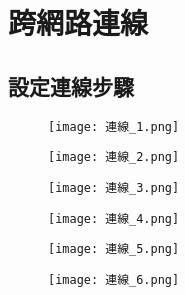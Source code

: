\chapter{跨網路連線}
\section{設定連線步驟}
\begin{figure}[hbt!]
  \begin{center}
    \texttt{[image: 連線\_1.png]}
  \end{center}
  \caption[關閉防火牆]{}
  \label{fig:photo}
\end{figure}

\begin{figure}[hbt!]
  \begin{center}
    \texttt{[image: 連線\_2.png]}
  \end{center}
  \caption[點選進階設定]{}
  \label{fig:photo}
\end{figure}

\begin{figure}[hbt!]
  \begin{center}
    \texttt{[image: 連線\_3.png]}
  \end{center}
  \caption[設定輸入及輸出規則類型]{}
  \label{fig:photo}
\end{figure}

\begin{figure}[hbt!]
  \begin{center}
    \texttt{[image: 連線\_4.png]}
  \end{center}
  \caption[設定特定遠端連接埠]{}
  \label{fig:photo}
\end{figure}

\begin{figure}[hbt!]
  \begin{center}
    \texttt{[image: 連線\_5.png]}
  \end{center}
  \caption[v允許連線]{}
  \label{fig:photo}
\end{figure}

\begin{figure}[hbt!]
  \begin{center}
    \texttt{[image: 連線\_6.png]}
  \end{center}
  \caption[設定名稱]{}
  \label{fig:photo}
\end{figure}

